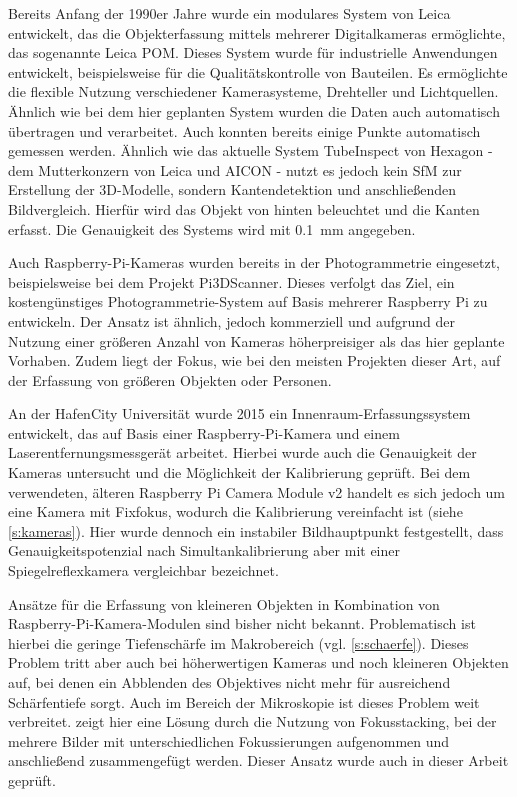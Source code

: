 \documentclass[./00PhotoBox]{subfiles}
\begin{document}
Bereits Anfang der 1990er Jahre wurde ein modulares System von Leica entwickelt, das die Objekterfassung mittels mehrerer Digitalkameras ermöglichte, das sogenannte Leica POM. Dieses System wurde für industrielle Anwendungen entwickelt, beispielsweise für die Qualitätskontrolle von Bauteilen. Es ermöglichte die flexible Nutzung verschiedener Kamerasysteme, Drehteller und Lichtquellen. Ähnlich wie bei dem hier geplanten System wurden die Daten auch automatisch übertragen und verarbeitet. Auch konnten bereits einige Punkte automatisch gemessen werden. Ähnlich wie das aktuelle System TubeInspect \citep[vgl.][]{aicon_tubeinspect} von Hexagon - dem Mutterkonzern von Leica und AICON - nutzt es jedoch kein \Gls{SfM} zur Erstellung der 3D-Modelle, sondern Kantendetektion und anschließenden Bildvergleich. Hierfür wird das Objekt von hinten beleuchtet und die Kanten erfasst. Die Genauigkeit des Systems wird mit \SI{0,1}{\milli\metre} angegeben.
\citep[vgl.][]{leica_pom_concept}

Auch Raspberry-Pi-Kameras wurden bereits in der Photogrammetrie eingesetzt, beispielsweise bei dem Projekt Pi3DScanner. Dieses verfolgt das Ziel, ein kostengünstiges Photo\-grammetrie-System auf Basis mehrerer Raspberry Pi zu entwickeln. Der Ansatz ist ähnlich, jedoch kommerziell und aufgrund der Nutzung einer größeren Anzahl von Kameras höherpreisiger als das hier geplante Vorhaben. Zudem liegt der Fokus, wie bei den meisten Projekten dieser Art, auf der Erfassung von größeren Objekten oder Personen.
\citep[vgl.][]{pi3dscanner}

An der HafenCity Universität wurde 2015 ein Innenraum-Erfassungssystem entwickelt, das auf Basis einer Raspberry-Pi-Kamera und einem Laserentfernungsmessgerät arbeitet. Hierbei wurde auch die Genauigkeit der Kameras untersucht und die Möglichkeit der Kalibrierung geprüft. Bei dem verwendeten, älteren Raspberry Pi Camera Module v2 handelt es sich jedoch um eine Kamera mit Fixfokus, wodurch die Kalibrierung vereinfacht ist (siehe \autoref{s:kameras}). Hier wurde dennoch ein instabiler \Gls{Bildhauptpunkt} festgestellt, dass Genauigkeitspotenzial nach Simultankalibrierung aber mit einer Spiegelreflexkamera vergleichbar bezeichnet.
\citep[vgl.][]{3d_raspi_laserscanner}

Ansätze für die Erfassung von kleineren Objekten in Kombination von Raspberry-Pi-Kamera-Modulen sind bisher nicht bekannt. Problematisch ist hierbei die geringe Tiefenschärfe im Makrobereich (vgl. \autoref{s:schaerfe}). Dieses Problem tritt aber auch bei höherwertigen Kameras und noch kleineren Objekten auf, bei denen ein Abblenden des Objektives nicht mehr für ausreichend Schärfentiefe sorgt. Auch im Bereich der Mikroskopie ist dieses Problem weit verbreitet. \citet{focusstack_sfm} zeigt hier eine Lösung durch die Nutzung von Fokusstacking, bei der mehrere Bilder mit unterschiedlichen Fokussierungen aufgenommen und anschließend zusammengefügt werden. Dieser Ansatz wurde auch in dieser Arbeit geprüft.
\end{document}
